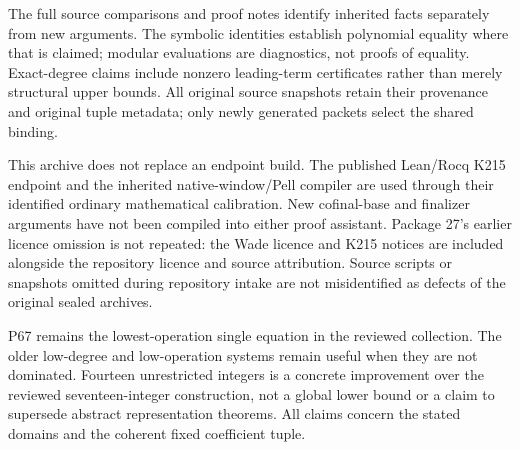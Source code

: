 \documentclass[11pt]{article}
\begin{document}
The full source comparisons and proof notes identify inherited facts separately from new arguments. The symbolic identities establish polynomial equality where that is claimed; modular evaluations are diagnostics, not proofs of equality. Exact-degree claims include nonzero leading-term certificates rather than merely structural upper bounds. All original source snapshots retain their provenance and original tuple metadata; only newly generated packets select the shared binding.

This archive does not replace an endpoint build. The published Lean/Rocq K215 endpoint and the inherited native-window/Pell compiler are used through their identified ordinary mathematical calibration. New cofinal-base and finalizer arguments have not been compiled into either proof assistant. Package 27's earlier licence omission is not repeated: the Wade licence and K215 notices are included alongside the repository licence and source attribution. Source scripts or snapshots omitted during repository intake are not misidentified as defects of the original sealed archives.

P67 remains the lowest-operation single equation in the reviewed collection. The older low-degree and low-operation systems remain useful when they are not dominated. Fourteen unrestricted integers is a concrete improvement over the reviewed seventeen-integer construction, not a global lower bound or a claim to supersede abstract representation theorems. All claims concern the stated domains and the coherent fixed coefficient tuple.
\end{document}
